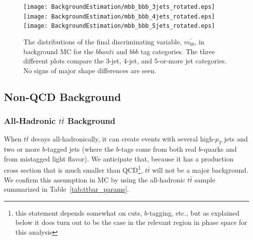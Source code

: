 \begin{figure}[hbt]
\texttt{[image: BackgroundEstimation/mbb\_bbb\_3jets\_rotated.eps]}
\texttt{[image: BackgroundEstimation/mbb\_bbb\_4jets\_rotated.eps]}
\texttt{[image: BackgroundEstimation/mbb\_bbb\_5jets\_rotated.eps]}
\caption{The distributions of the final discriminating variable, $m_{bb}^{'}$, 
in background MC for the $bbanti$ and $bbb$ tag categories.  The three different plots
compare the 3-jet, 4-jet, and 5-or-more jet categories.  No signs of major shape
differences are seen.
\label{fig:bkg_shape_compare}}
\end{figure}




 







\subsection{Non-QCD Background}
\label{sec:non_qcd_bkgs}

\subsubsection{All-Hadronic $t\bar{t}$ Background}
When $t\bar{t}$ decays all-hadronically, it can create events with several high-$p_T$
jets and two or more $b$-tagged jets (where the $b$-tags come from both real $b$-quarks
and from mistagged light flavor).  We anticipate that, because it has a production
cross section that is much smaller than QCD\footnote{this statement depends somewhat
on cuts, $b$-tagging, etc., but as explained below it does turn out to be the case
in the relevant region in phase space for this analysis}, $t\bar{t}$ will not be a major background.
We confirm this assumption in MC by using the all-hadronic $t\bar{t}$ sample summarized
in Table~\ref{tab:ttbar_params}.


